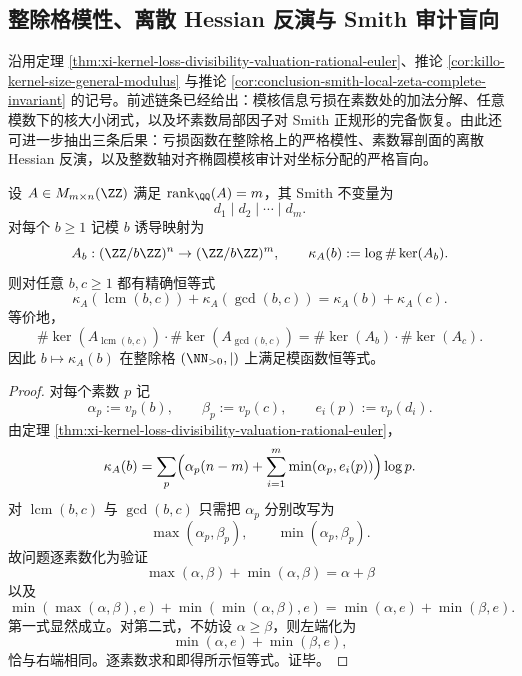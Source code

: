 \subsection{整除格模性、离散 Hessian 反演与 Smith 审计盲向}\label{subsec:conclusion-smith-kernel-audit-modularity-blind-direction}
沿用定理 \ref{thm:xi-kernel-loss-divisibility-valuation-rational-euler}、推论 \ref{cor:killo-kernel-size-general-modulus} 与推论 \ref{cor:conclusion-smith-local-zeta-complete-invariant} 的记号。前述链条已经给出：模核信息亏损在素数处的加法分解、任意模数下的核大小闭式，以及坏素数局部因子对 Smith 正规形的完备恢复。由此还可进一步抽出三条后果：亏损函数在整除格上的严格模性、素数幂剖面的离散 Hessian 反演，以及整数轴对齐椭圆模核审计对坐标分配的严格盲向。

\begin{theorem}[信息亏损函数在整除格上的模性]\label{thm:conclusion-smith-loss-modularity-divisibility-lattice}
设 \(A\in M_{m\times n}(\ZZ)\) 满足 \(\operatorname{rank}_{\QQ}(A)=m\)，其 Smith 不变量为
\[
d_1\mid d_2\mid\cdots\mid d_m.
\]
对每个 \(b\ge 1\) 记模 \(b\) 诱导映射为
\[
A_b:(\ZZ/b\ZZ)^n\to(\ZZ/b\ZZ)^m,
\qquad
\kappa_A(b):=\log\#\ker(A_b).
\]
则对任意 \(b,c\ge 1\) 都有精确恒等式
\[
\boxed{\;
\kappa_A(\operatorname{lcm}(b,c))
+\kappa_A(\gcd(b,c))
=
\kappa_A(b)+\kappa_A(c).\;}
\]
等价地，
\[
\boxed{\;
\#\ker(A_{\operatorname{lcm}(b,c)})\cdot \#\ker(A_{\gcd(b,c)})
=
\#\ker(A_b)\cdot \#\ker(A_c).\;}
\]
因此 \(b\mapsto \kappa_A(b)\) 在整除格 \((\NN_{>0},\mid)\) 上满足模函数恒等式。
\end{theorem}
\begin{proof}
对每个素数 \(p\) 记
\[
\alpha_p:=v_p(b),
\qquad
\beta_p:=v_p(c),
\qquad
e_i(p):=v_p(d_i).
\]
由定理 \ref{thm:xi-kernel-loss-divisibility-valuation-rational-euler}，
\[
\kappa_A(b)
=
\sum_p
\Bigl(
\alpha_p(n-m)+\sum_{i=1}^{m}\min(\alpha_p,e_i(p))
\Bigr)\log p.
\]
对 \(\operatorname{lcm}(b,c)\) 与 \(\gcd(b,c)\) 只需把 \(\alpha_p\) 分别改写为
\[
\max(\alpha_p,\beta_p),
\qquad
\min(\alpha_p,\beta_p).
\]
故问题逐素数化为验证
\[
\max(\alpha,\beta)+\min(\alpha,\beta)=\alpha+\beta
\]
以及
\[
\min(\max(\alpha,\beta),e)+\min(\min(\alpha,\beta),e)
=
\min(\alpha,e)+\min(\beta,e).
\]
第一式显然成立。对第二式，不妨设 \(\alpha\ge\beta\)，则左端化为
\[
\min(\alpha,e)+\min(\beta,e),
\]
恰与右端相同。逐素数求和即得所示恒等式。证毕。
\end{proof}


